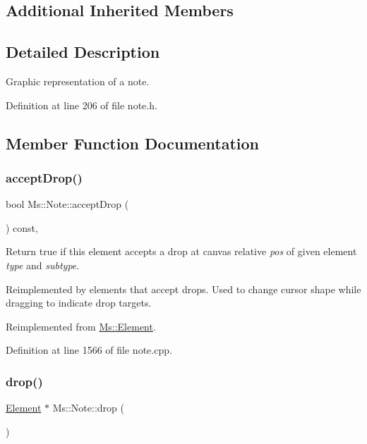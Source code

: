 \subsection*{Additional Inherited Members}


\subsection{Detailed Description}
Graphic representation of a note. 

Definition at line 206 of file note.\+h.



\subsection{Member Function Documentation}
\mbox{\label{class_ms_1_1_note_abaffbc8698b96263bb1d9b3f4b69c63e}} 
\subsubsection{\texorpdfstring{accept\+Drop()}{acceptDrop()}}
{\footnotesize\ttfamily bool Ms\+::\+Note\+::accept\+Drop (\begin{DoxyParamCaption}\item[{\hyperlink{class_ms_1_1_edit_data}{Edit\+Data} \&}]{ }\end{DoxyParamCaption}) const\hspace{0.3cm}{\ttfamily [override]}, {\ttfamily [virtual]}}

Return true if this element accepts a drop at canvas relative {\itshape pos} of given element {\itshape type} and {\itshape subtype}.

Reimplemented by elements that accept drops. Used to change cursor shape while dragging to indicate drop targets. 

Reimplemented from \hyperlink{class_ms_1_1_element_a35614445f0bc2212cbcc75c3f5810543}{Ms\+::\+Element}.



Definition at line 1566 of file note.\+cpp.

\mbox{\label{class_ms_1_1_note_a8c52c0c09eef8173b3bc7b42f2a4210a}} 
\subsubsection{\texorpdfstring{drop()}{drop()}}
{\footnotesize\ttfamily \hyperlink{class_ms_1_1_element}{Element} $\ast$ Ms\+::\+Note\+::drop (\begin{DoxyParamCaption}\item[{\hyperlink{class_ms_1_1_edit_data}{Edit\+Data} \&}]{ }\end{DoxyParamCaption})\hspace{0.3cm}{\ttfamily [virtual]}}

